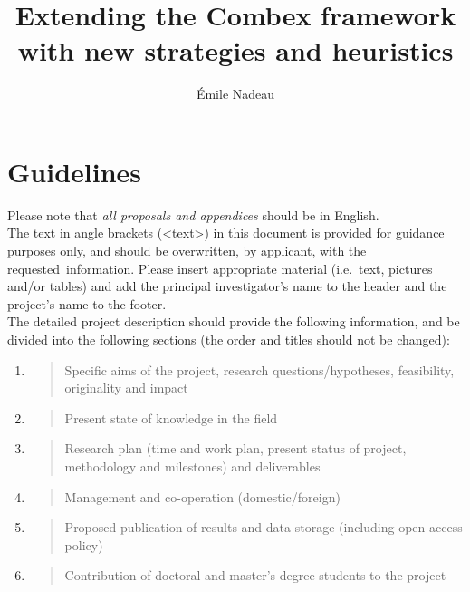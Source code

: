 \documentclass{rannis}
\title{Extending the Combex framework with new strategies and heuristics}
\author{\'Emile Nadeau}
\theoremstyle{definition}
\begin{document}
\newcommand{\lastpageref}{\pageref{LastPageOfDescription}}
\thispagestyle{empty}

\maketitle

\newpage

\section*{Guidelines}\label{guidelines}

\noindent
Please note that \emph{all proposals and appendices} should be in
English.\\

\noindent
The text in angle brackets (<text>) in this document is provided for guidance
purposes only, and should be overwritten, by applicant, with the \mbox{requested information}.
Please insert appropriate material (i.e.\ text, pictures and/or tables)
and add the principal investigator's name to the header and the
project's name to the footer.\\

\noindent
The detailed project description should provide the following
information, and be divided into the following sections (the order and
titles should not be changed):\\
{\it
\begin{enumerate}
\def\labelenumi{\Alph{enumi}.}
\setlength\itemsep{-0.5em}
\item
  \begin{quote}
  Specific aims of the project, research questions/hypotheses,
  feasibility, originality and impact
  \end{quote}
\item
  \begin{quote}
  Present state of knowledge in the field
  \end{quote}
\item
  \begin{quote}
  Research plan (time and work plan, present status of project,
  methodology and milestones) and deliverables
  \end{quote}
\item
  \begin{quote}
  Management and co-operation (domestic/foreign)
  \end{quote}
\item
  \begin{quote}
  Proposed publication of results and data storage (including open
  access policy)
  \end{quote}
\item
  \begin{quote}
  Contribution of doctoral and master's degree students to the
  project\\
  \end{quote}
\end{enumerate}
}
\end{document}
